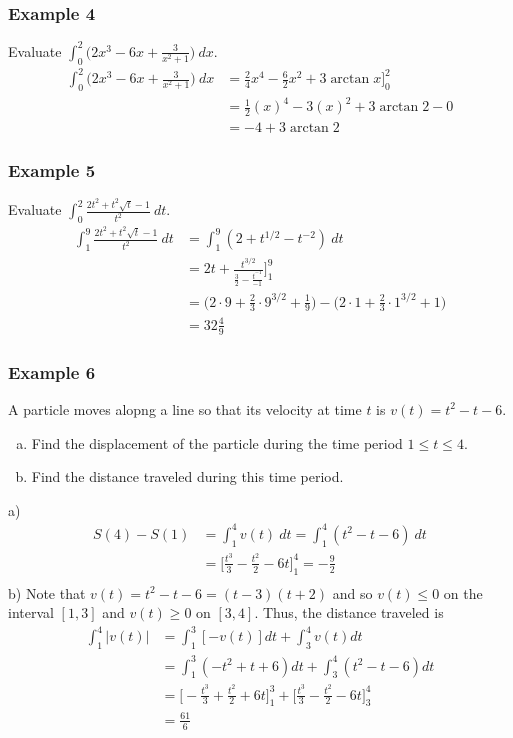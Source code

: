 \documentclass[11pt]{article}
\begin{document}
\subsubsection{Example 4}
Evaluate $ \displaystyle{\int_{0}^{2}\Big(2x^3-6x+\frac{3}{x^2+1}\Big)\ dx} $.
\begin{align*}
    \int_{0}^{2}\Big(2x^3-6x+\frac{3}{x^2+1}\Big)\ dx
    &= \frac{2}{4}x^4 - \frac{6}{2}x^2 + 3 \arctan x \bigg]_0^2\\
    &= \frac{1}{2}(x)^4 - 3(x)^2 + 3\arctan 2 - 0\\
    &= -4 + 3\arctan 2
\end{align*}

\subsubsection{Example 5}
Evaluate $ \displaystyle{\int_{0}^{2}\frac{2t^2+t^2\sqrt{t} - 1}{t^2}\ dt} $.
\begin{align*}
    \int_{1}^{9}\frac{2t^2+t^2\sqrt{t} - 1}{t^2}\ dt
    &= \int_{1}^{9}(2+t^{1/2} - t^{-2})\ dt\\
    &= 2t + \frac{t^{3/ 2}}{\frac{3}{2}-\frac{t^{-1}}{-1}}\Bigg]_1^9\\
    &= \Big(2\cdot 9 + \frac{2}{3}\cdot 9^{3/ 2}+\frac{1}{9}\Big)-\Big(2\cdot1 + \frac{2}{3}\cdot 1^{3/2}+1\Big)\\
    &=32 \frac{4}{9}
\end{align*}

\subsubsection{Example 6}
A particle moves alopng a line so that its velocity at time $ t $ is $ v(t)=t^2-t-6 $.
\begin{enumerate}[a)]
    \item Find the displacement of the particle during the time period $ 1\leq t\leq 4 $.
    \item Find the distance traveled during this time period.
\end{enumerate}

\noindent
a)
\begin{align*}
    S(4)-S(1) &= \int_{1}^{4}v(t)\ dt = \int_{1}^{4}(t^2-t-6)\ dt\\
    &= \bigg[ \frac{t^3}{3} - \frac{t^2}{2} - 6t \bigg]_1^4 = -\frac{9}{2}\\
\end{align*}
b) Note that $ v(t)=t^2-t-6=(t-3)(t+2) $ and so $ v(t)\leq 0 $ on the interval $ [1,3] $ and $ v(t)\geq 0 \text{ on } [3,4] $. Thus, the distance traveled is
\begin{align*}
    \int_{1}^{4}|v(t)|
    &= \int_{1}^{3}[-v(t)]dt + \int_{3}^{4}v(t)dt\\
    &= \int_{1}^{3}(-t^2+t+6)dt + \int_{3}^{4}(t^2-t-6)dt\\
    &= \bigg[ -\frac{t^3}{3} + \frac{t^2}{2} + 6t\bigg]_1^3 + \bigg[\frac{t^3}{3} - \frac{t^2}{2} - 6t\bigg]_3^4\\
    &= \frac{61}{6}
\end{align*}
\end{document}

